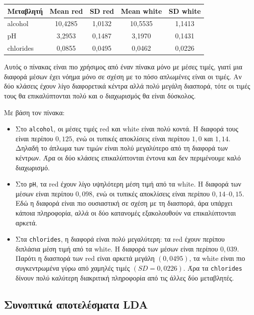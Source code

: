\documentclass[11pt,a4paper]{article}
\newcommand{\code}[1]{\texttt{#1}}
\begin{document}
\begin{center}
\begin{tabular}{lcccc}
\toprule
Μεταβλητή & Mean red & SD red & Mean white & SD white \\
\midrule
alcohol & 10,4285 & 1,0132 & 10,5535 & 1,1413 \\
pH & 3,2953 & 0,1487 & 3,1970 & 0,1431 \\
chlorides & 0,0855 & 0,0495 & 0,0462 & 0,0226 \\
\bottomrule
\end{tabular}
\end{center}

Αυτός ο πίνακας είναι πιο χρήσιμος από έναν πίνακα μόνο με μέσες τιμές,
γιατί μια διαφορά μέσων έχει νόημα μόνο σε σχέση με το πόσο απλωμένες είναι
οι τιμές. Αν δύο κλάσεις έχουν λίγο διαφορετικά κέντρα αλλά πολύ μεγάλη
διασπορά, τότε οι τιμές τους θα επικαλύπτονται πολύ και ο διαχωρισμός θα
είναι δύσκολος.

Με βάση τον πίνακα:
\begin{itemize}
    \item Στο \code{alcohol}, οι μέσες τιμές red και white είναι πολύ κοντά.
    Η διαφορά τους είναι περίπου \(0{,}125\), ενώ οι τυπικές αποκλίσεις είναι
    περίπου \(1{,}0\) και \(1{,}14\). Δηλαδή το άπλωμα των τιμών είναι πολύ
    μεγαλύτερο από τη διαφορά των κέντρων. Άρα οι δύο κλάσεις επικαλύπτονται
    έντονα και δεν περιμένουμε καλό διαχωρισμό.

    \item Στο \code{pH}, τα red έχουν λίγο υψηλότερη μέση τιμή από τα white.
    Η διαφορά των μέσων είναι περίπου \(0{,}098\), ενώ οι τυπικές αποκλίσεις
    είναι περίπου \(0{,}14\)--\(0{,}15\). Εδώ η διαφορά είναι πιο ουσιαστική
    σε σχέση με τη διασπορά, άρα υπάρχει κάποια πληροφορία, αλλά οι δύο
    κατανομές εξακολουθούν να επικαλύπτονται αρκετά.

    \item Στα \code{chlorides}, η διαφορά είναι πολύ μεγαλύτερη: τα red έχουν
    περίπου διπλάσια μέση τιμή από τα white. Η διαφορά των μέσων είναι
    περίπου \(0{,}039\). Παρότι η διασπορά των red είναι αρκετά μεγάλη
    \((0{,}0495)\), τα white είναι πιο συγκεντρωμένα γύρω από χαμηλές τιμές
    \((SD = 0{,}0226)\). Άρα τα \code{chlorides} δίνουν πολύ καλύτερη
    διακριτική πληροφορία από τις άλλες δύο μεταβλητές.
\end{itemize}

\subsection{Συνοπτικά αποτελέσματα LDA}
\end{document}
